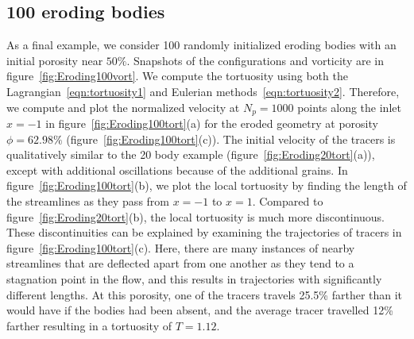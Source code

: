 \documentclass{jfm}
\begin{document}
\subsection{100 eroding bodies}
\label{sec:Eroding100}
As a final example, we consider 100 randomly initialized eroding bodies
with an initial porosity near $50\%$.  Snapshots of the configurations
and vorticity are in figure~\ref{fig:Eroding100vort}. We compute the
tortuosity using both the Lagrangian~\eqref{eqn:tortuosity1} and
Eulerian methods~\eqref{eqn:tortuosity2}. Therefore, we compute and plot
the normalized velocity at $N_p = 1000$ points along the inlet $x=-1$ in
figure~\ref{fig:Eroding100tort}(a) for the eroded geometry at porosity
$\phi = 62.98\%$ (figure~\ref{fig:Eroding100tort}(c)).  The initial
velocity of the tracers is qualitatively similar to the 20 body example
(figure~\ref{fig:Eroding20tort}(a)), except with additional oscillations
because of the additional grains.  In
figure~\ref{fig:Eroding100tort}(b), we plot the local tortuosity by
finding the length of the streamlines as they pass from $x=-1$ to $x=1$.
Compared to figure~\ref{fig:Eroding20tort}(b), the local tortuosity is
much more discontinuous.  These discontinuities can be explained by
examining the trajectories of tracers in
figure~\ref{fig:Eroding100tort}(c).  Here, there are many instances of
nearby streamlines that are deflected apart from one another as they
tend to a stagnation point in the flow, and this results in trajectories
with significantly different lengths.  At this porosity, one of the
tracers travels 25.5\% farther than it would have if the bodies had been
absent, and the average tracer travelled 12\% farther resulting in a
tortuosity of $T = 1.12$.
\end{document}
